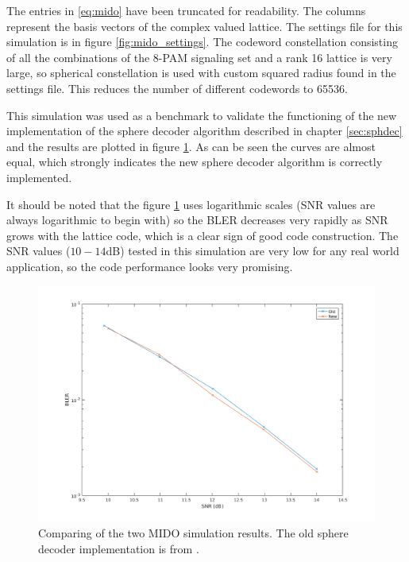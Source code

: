 \documentclass[english,12pt,a4paper,pdftex,sci,utf8]{aaltothesis}
\begin{document}
The entries in \eqref{eq:mido} have been truncated for readability. The columns represent the basis vectors of the complex valued lattice. The settings file for this simulation is in figure \ref{fig:mido_settings}. The codeword constellation consisting of all the combinations of the 8-PAM signaling set and a rank 16 lattice is very large, so spherical constellation is used with custom squared radius found in the settings file. This reduces the number of different codewords to 65536. 
\par This simulation was used as a benchmark to validate the functioning of the new implementation of the sphere decoder algorithm described in chapter \ref{sec:sphdec} and the results are plotted in figure \ref{fig:mido}. As can be seen the curves are almost equal, which strongly indicates the new sphere decoder algorithm is correctly implemented.
\par It should be noted that the figure \ref{fig:mido} uses logarithmic scales (SNR values are always logarithmic to begin with) so the BLER decreases very rapidly as SNR grows with the lattice code, which is a clear sign of good code construction. The SNR values ($10-14 $dB) tested in this simulation are very low for any real world application, so the code performance looks very promising.

\begin{figure}[htb]
  \centering
\includegraphics[width=\linewidth]{mido_sample_all_65k_unbiased}
  \caption{Comparing of the two MIDO simulation results. The old sphere decoder implementation is from \cite{ranto}.}
  \label{fig:mido}
\end{figure}
\end{document}
